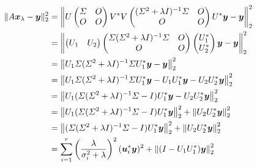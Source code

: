 \begin{align}
    \|A \bm{x}_{\lambda} - \bm{y}\|_2^2
     & = \left\| U
    \begin{pmatrix}
        \varSigma & O \\
        O      & O
    \end{pmatrix}
    V^* V
    \begin{pmatrix}
        (\varSigma^2 + \lambda I)^{-1} \varSigma & O \\
        O                                  & O
    \end{pmatrix}
    U^* \bm{y} - \bm{y} \right\|_2^2
    \notag                                                                                        \\
     & = \left\|
    \begin{pmatrix}
        U_1 & U_2
    \end{pmatrix}
    \begin{pmatrix}
        \varSigma (\varSigma^2 + \lambda I)^{-1} \varSigma & O \\
        O                                         & O
    \end{pmatrix}
    \begin{pmatrix}
        U_1^* \\ U_2^*
    \end{pmatrix}
    \bm{y} - \bm{y} \right\|_2^2
    \notag                                                                                        \\
     & = \left\| U_1 \varSigma (\varSigma^2 + \lambda I)^{-1} \varSigma U_1^* \bm{y} - \bm{y} \right\|_2^2
    \notag                                                                                        \\
     & = \left\| U_1 \varSigma (\varSigma^2 + \lambda I)^{-1} \varSigma U_1^* \bm{y}
    - U_1 U_1^* \bm{y} - U_2 U_2^* \bm{y} \right\|_2^2
    \notag                                                                                        \\
     & = \left\| U_1 (\varSigma (\varSigma^2 + \lambda I)^{-1} \varSigma - I) U_1^* \bm{y}
    - U_2 U_2^* \bm{y} \right\|_2^2
    \notag                                                                                        \\
     & = \left\| U_1 (\varSigma (\varSigma^2 + \lambda I)^{-1} \varSigma - I) U_1^* \bm{y} \right\|_2^2
    + \left\| U_2 U_2^* \bm{y} \right\|_2^2
    \notag                                                                                        \\
     & = \left\| (\varSigma (\varSigma^2 + \lambda I)^{-1} \varSigma - I) U_1^* \bm{y} \right\|_2^2
    + \left\| U_2 U_2^* \bm{y} \right\|_2^2
    \notag                                                                                        \\
     & = \sum_{i = 1}^r \left(\frac{\lambda}{\sigma_i^2 + \lambda}\right)^2 (\bm{u}_i^* \bm{y})^2
    + \left\| (I - U_1 U_1^*) \bm{y} \right\|_2^2
    \label{eq:regularization_tikhonov_residual-by-svd}
\end{align}

